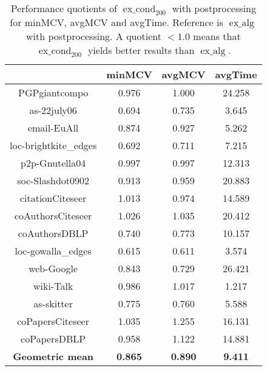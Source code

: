 \documentclass[pdftex]{llncs}
\newcommand{\excond}{\operatorname{ex\_cond}}
\newcommand{\exalg}{\operatorname{ex\_alg}}
\numberwithin{equation}{section}
\numberwithin{example}{section}
\numberwithin{table}{section}
\begin{document}
\begin{table}[tb]
  \caption{Performance quotients of $\excond_{200}$ with postprocessing for minMCV, avgMCV
    and avgTime. Reference is $\exalg$ with postprocessing. A quotient $< 1.0$ means that
    $\excond_{200}$ yields better results than $\exalg$.}
\begin{center}
\begin{tabular}{ c | c  c | c }
& minMCV  & avgMCV & avgTime\\
                        \hline \hline
PGPgiantcompo           &  0.976              &   1.000              &  24.258               \\ \hline
as-22july06             &  0.694              &   0.735              &   3.645               \\ \hline
email-EuAll             &  0.874              &   0.927              &   5.262               \\ \hline
loc-brightkite\_edges   &  0.692              &   0.711              &   7.215               \\ \hline
p2p-Gnutella04          &  0.997              &   0.997              &  12.313               \\ \hline
soc-Slashdot0902        &  0.913              &   0.959              &  20.883               \\ \hline
citationCiteseer        &  1.013              &   0.974              &  14.589               \\ \hline
coAuthorsCiteseer       &  1.026              &   1.035              &  20.412               \\ \hline 
coAuthorsDBLP           &  0.740              &   0.773              &  10.157               \\ \hline
loc-gowalla\_edges      &  0.615              &   0.611              &   3.574               \\ \hline
web-Google              &  0.843              &   0.729              &  26.421               \\ \hline
wiki-Talk               &  0.986              &   1.017              &   1.217               \\ \hline
as-skitter              &  0.775              &   0.760              &   5.588               \\ \hline
coPapersCiteseer        &  1.035              &   1.255              &  16.131               \\ \hline
coPapersDBLP            &  0.958              &   1.122              &  14.881               \\ \hline  \hline
\textbf{Geometric mean} &  \textbf{0.865}     &  \textbf{0.890}      &\textbf{9.411}        \\ \hline
\end{tabular}
\end{center}
\label{tab:MCV_200}
\end{table}
\end{document}
